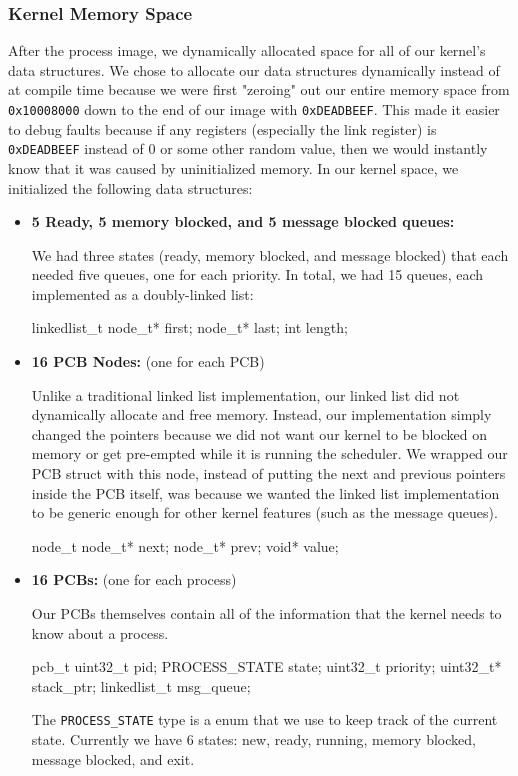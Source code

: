 \documentclass[12pt]{article}
\begin{document}
\subsubsection{Kernel Memory Space}

After the process image, we dynamically allocated space for all of our kernel's data structures. We chose to allocate our data structures dynamically instead of at compile time because we were first "zeroing" out our entire memory space from \texttt{0x10008000} down to the end of our image with \texttt{0xDEADBEEF}. This made it easier to debug faults because if any registers (especially the link register) is \texttt{0xDEADBEEF} instead of 0 or some other random value, then we would instantly know that it was caused by uninitialized memory. In our kernel space, we initialized the following data structures:

\begin{itemize}
	\item \textbf{5 Ready, 5 memory blocked, and 5 message blocked queues:} 
	
	We had three states (ready, memory blocked, and message blocked) that each needed five queues, one for each priority. In total, we had 15 queues, each implemented as a doubly-linked list:
	\begin{code}
linkedlist_t
    node_t* first;
    node_t* last;
    int length;
	\end{code}
	
	\item \textbf{16 PCB Nodes:} (one for each PCB)
	
	Unlike a traditional linked list implementation, our linked list did not dynamically allocate and free memory. Instead, our implementation simply changed the pointers because we did not want our kernel to be blocked on memory or get pre-empted while it is running the scheduler. We wrapped our PCB struct with this node, instead of putting the next and previous pointers inside the PCB itself, was because we wanted the linked list implementation to be generic enough for other kernel features (such as the message queues).
	\begin{code}
node_t
    node_t* next;
    node_t* prev;
    void* value;
	\end{code}
	
	\item \textbf{16 PCBs:} (one for each process)
	
	Our PCBs themselves contain all of the information that the kernel needs to know about a process.
	\begin{code}
pcb_t
    uint32_t pid;
    PROCESS_STATE state;
    uint32_t priority;
    uint32_t* stack_ptr;
    linkedlist_t msg_queue;
	\end{code}
	
	The \texttt{PROCESS\_STATE} type is a enum that we use to keep track of the current state. Currently we have 6 states: new, ready, running, memory blocked, message blocked, and exit. 
	
\end{itemize}
\end{document}
